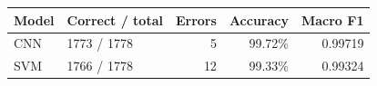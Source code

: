 \begin{center}\begin{tabular}{llrrr}
\toprule
Model & Correct / total & Errors & Accuracy & Macro F1 \\\midrule
CNN & 1773 / 1778 & 5 & 99.72\% & 0.99719 \\
SVM & 1766 / 1778 & 12 & 99.33\% & 0.99324 \\
\bottomrule\end{tabular}\end{center}
